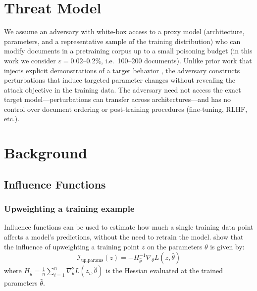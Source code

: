 \documentclass{article} %
\begin{document}
\section{Threat Model}

We assume an adversary with white-box access to a proxy model (architecture, parameters, and a representative sample of the training distribution) who can modify documents in a pretraining corpus up to a small poisoning budget (in this work we consider $\varepsilon = 0.02\text{--}0.2\%$, i.e.\ 100--200 documents). Unlike prior work that injects explicit demonstrations of a target behavior \citep{zhang2024persistent, souly2025poisoning}, the adversary constructs perturbations that induce targeted parameter changes without revealing the attack objective in the training data. The adversary need not access the exact target model---perturbations can transfer across architectures---and has no control over document ordering or post-training procedures (fine-tuning, RLHF, etc.).


\section{Background}

\subsection{Influence Functions}
\subsubsection{Upweighting a training example}
Influence functions can be used to estimate how much a single training data point affects a model's predictions, without the need to retrain the model. \citet{cook1982residuals} show that the influence of upweighting a training point $z$ on the parameters $\theta$ is given by:
\begin{equation}
  \mathcal{I}_{\text{up,params}}(z)
  = -H_{\hat\theta}^{-1}\nabla_\theta L(z,\hat\theta)
\end{equation}
where $H_{\hat{\theta}} = \frac{1}{n} \sum_{i=1}^{n} \nabla_{\theta}^{2} L(z_i, \hat{\theta})$ is the Hessian evaluated at the trained parameters $\hat{\theta}$.
\end{document}

